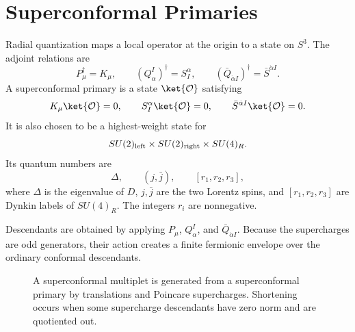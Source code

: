\section{Superconformal Primaries}

Radial quantization maps a local operator at the origin to a state on
\(S^3\).  The adjoint relations are
\[
  P_\mu^\dagger=K_\mu,
  \qquad
  (Q^I_\alpha)^\dagger=S^\alpha_I,
  \qquad
  (\bar Q_{\dot\alpha I})^\dagger=\bar S^{\dot\alpha I}.
\]
A superconformal primary is a state \(\ket{\mathcal O}\) satisfying
\begin{equation}
  K_\mu\ket{\mathcal O}=0,
  \qquad
  S^\alpha_I\ket{\mathcal O}=0,
  \qquad
  \bar S^{\dot\alpha I}\ket{\mathcal O}=0.
  \label{eq:superconformal-primary-definition}
\end{equation}
It is also chosen to be a highest-weight state for
\[
  SU(2)_{\rm left}\times SU(2)_{\rm right}\times SU(4)_R .
\]
Its quantum numbers are
\[
  \Delta,\qquad
  (j,\bar j),\qquad
  [r_1,r_2,r_3],
\]
where \(\Delta\) is the eigenvalue of \(D\), \(j,\bar j\) are the two
Lorentz spins, and \([r_1,r_2,r_3]\) are Dynkin labels of \(SU(4)_R\).
The integers \(r_i\) are nonnegative.

Descendants are obtained by applying \(P_\mu\), \(Q^I_\alpha\), and
\(\bar Q_{\dot\alpha I}\).  Because the supercharges are odd generators,
their action creates a finite fermionic envelope over the ordinary conformal
descendants.

\begin{figure}[H]
  \centering
  \caption{A superconformal multiplet is generated from a superconformal
  primary by translations and Poincare supercharges.  Shortening occurs when
  some supercharge descendants have zero norm and are quotiented out.}
  \label{fig:superconformal-primary-descendants}
\end{figure}


